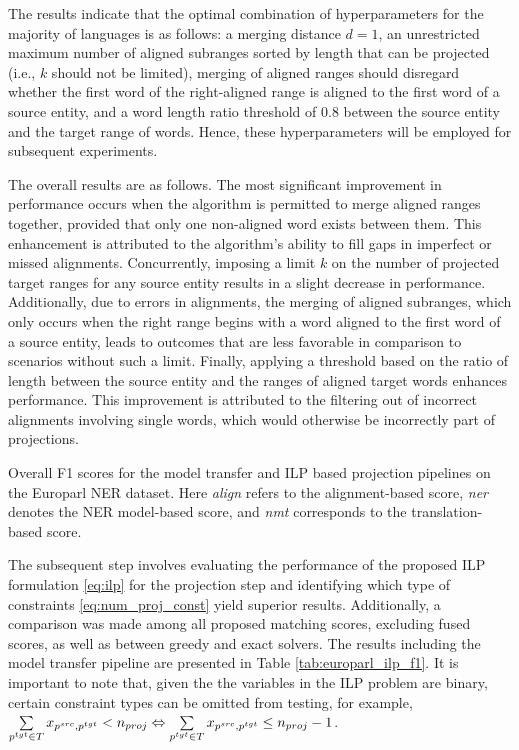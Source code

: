 The results indicate that the optimal combination of hyperparameters for the majority of
languages is as follows: a merging distance \( d = 1 \), an unrestricted maximum number
of aligned subranges sorted by length that can be projected (i.e., \( k \) should not be
limited), merging of aligned ranges should disregard whether the first word of the
right-aligned range is aligned to the first word of a source entity, and a word length
ratio threshold of \( 0.8 \)  between the source entity and the target range of words.
Hence, these hyperparameters will be employed for subsequent experiments.

The overall results are as follows. The most significant improvement in performance
occurs when the algorithm is permitted to merge aligned ranges together, provided
that only one non-aligned word exists between them. This enhancement is attributed to
the algorithm's ability to fill gaps in imperfect or missed alignments. Concurrently,
imposing a limit \( k \) on the number of projected target ranges for any source entity
results in a slight decrease in performance. Additionally, due to errors in alignments,
the merging of aligned subranges, which only occurs when the right range begins with a
word aligned to the first word of a source entity, leads to outcomes that are less
favorable in comparison to scenarios without such a limit. Finally, applying a threshold
based on the ratio of length between the source entity and the ranges of aligned target
words enhances performance. This improvement is attributed to the filtering out of
incorrect alignments involving single words, which would otherwise be incorrectly part of projections.

\begin{table}[t]
  \centering
  
  \caption{Overall F1 scores for the model transfer and ILP based projection pipelines
    on the Europarl NER dataset. Here \textit{align} refers to the alignment-based score,
    \textit{ner} denotes the NER model-based score, and \textit{nmt} corresponds to
  the translation-based score.}
  \label{tab:europarl_ilp_f1}
\end{table}

The subsequent step involves evaluating the performance of the proposed ILP
formulation \eqref{eq:ilp} for the projection step and identifying which type
of constraints \eqref{eq:num_proj_const} yield superior results. Additionally, a
comparison was made among all proposed matching scores, excluding fused scores,
as well as between greedy and exact solvers. The results including the model transfer pipeline
are presented in Table \ref{tab:europarl_ilp_f1}. It is important to note that, given the
the variables in the ILP problem are binary, certain constraint types can be
omitted from testing, for example,
\( \sum\limits_{p^{tgt} \in T} x_{p^{src}, p^{tgt}} < n_{proj} \Leftrightarrow \sum\limits_{p^{tgt} \in T} x_{p^{src}, p^{tgt}} \leq n_{proj} - 1 \).

